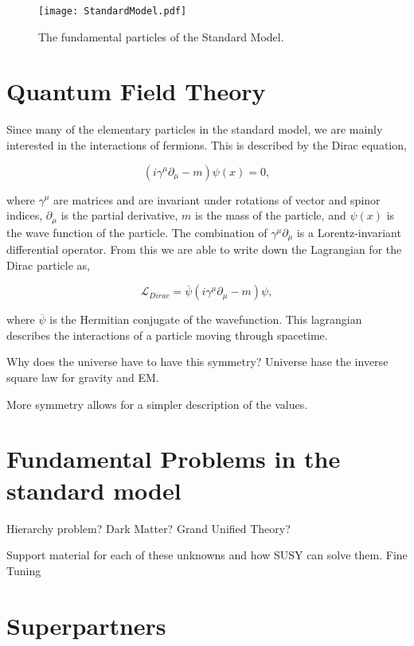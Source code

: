 \begin{figure}
 	\centering
	\texttt{[image: StandardModel.pdf]}
 	\caption{The fundamental particles of the Standard Model.}
 	\label{SMParticles} 
\end{figure}
 
 \section{Quantum Field Theory}
 \label{QFT}
 
 Since many of the elementary particles in the standard model, we are mainly interested in the interactions of fermions. This is described by the Dirac equation, 
 
\begin{equation}
(i\gamma^\mu\partial_\mu-m)\psi(x)=0\label{Dirac},
\end{equation}

where $\gamma^\mu$ are matrices and are invariant under rotations of vector and spinor indices, $\partial_\mu$ is the partial derivative, $m$ is the mass of the particle, and $\psi(x)$ is the wave function of the particle. The combination of $\gamma^\mu\partial_\mu$ is a Lorentz-invariant differential operator. From this we are able to write down the Lagrangian for the Dirac particle as, 

\begin{equation}
\mathcal{L}_{Dirac}=\overline{\psi}(i\gamma^\mu\partial_\mu-m)\psi,
\end{equation}
 
 where $\overline{\psi}$ is the Hermitian conjugate of the wavefunction. This lagrangian describes the interactions of a particle moving through spacetime. 

Why does the universe have to have this symmetry?
Universe hase the inverse square law for gravity and EM.

More symmetry allows for a simpler description of the values. 

\section{Fundamental Problems in the standard model}
\label{sec:Hierarchy}

Hierarchy problem?
Dark Matter?
Grand Unified Theory?

Support material for each of these unknowns and how SUSY can solve them. Fine Tuning

\section{Superpartners}
\label{sec:superpartners}

